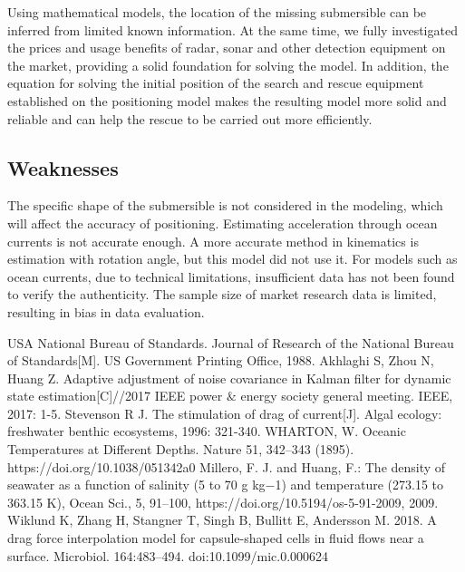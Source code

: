 \documentclass[12pt]{article}  %
\begin{document}
\indent Using mathematical models, the location of the missing submersible can be inferred from limited known information. At the same time, we fully investigated the prices and usage benefits of radar, sonar and other detection equipment on the market, providing a solid foundation for solving the model. In addition, the equation for solving the initial position of the search and rescue equipment established on the positioning model makes the resulting model more solid and reliable and can help the rescue to be carried out more efficiently.

    \subsection{Weaknesses}
   \indent The specific shape of the submersible is not considered in the modeling, which will affect the accuracy of positioning. Estimating acceleration through ocean currents is not accurate enough. A more accurate method in kinematics is estimation with rotation angle, but this model did not use it. For models such as ocean currents, due to technical limitations, insufficient data has not been found to verify the authenticity. The sample size of market research data is limited, resulting in bias in data evaluation.
\clearpage   %
\begin{thebibliography}{99}
     USA National Bureau of Standards. Journal of Research of the National Bureau of Standards[M]. US Government Printing Office, 1988.
	 Akhlaghi S, Zhou N, Huang Z. Adaptive adjustment of noise covariance in Kalman filter for dynamic state estimation[C]//2017 IEEE power $\&$ energy society general meeting. IEEE, 2017: 1-5.
	 Stevenson R J. The stimulation of drag of current[J]. Algal ecology: freshwater benthic ecosystems, 1996: 321-340.
     WHARTON, W. Oceanic Temperatures at Different Depths. Nature 51, 342–343 (1895). https://doi.org/10.1038/051342a0
     Millero, F. J. and Huang, F.: The density of seawater as a function of salinity (5 to 70 g kg−1) and temperature (273.15 to 363.15 K), Ocean Sci., 5, 91–100, https://doi.org/10.5194/os-5-91-2009, 2009.
     Wiklund K, Zhang H, Stangner T, Singh B, Bullitt E, Andersson M. 2018. A drag force interpolation model for capsule-shaped cells in fluid flows near a surface. Microbiol. 164:483–494. doi:10.1099/mic.0.000624
\end{thebibliography}
%  
\end{document}
